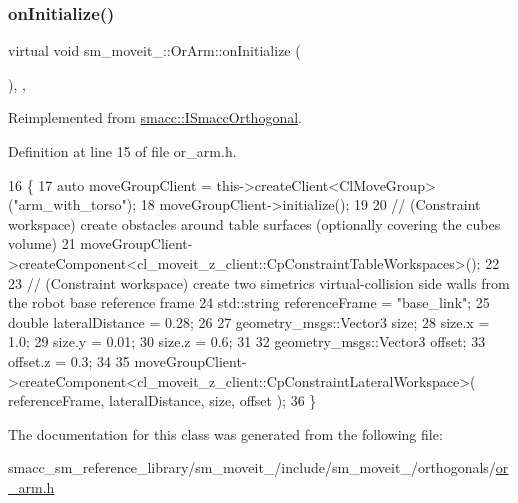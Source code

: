 \subsubsection{\texorpdfstring{on\+Initialize()}{onInitialize()}}
{\footnotesize\ttfamily virtual void sm\+\_\+moveit\+\_\+::\+Or\+Arm\+::on\+Initialize (\begin{DoxyParamCaption}{ }\end{DoxyParamCaption})\hspace{0.3cm}{\ttfamily [inline]}, {\ttfamily [override]}, {\ttfamily [virtual]}}



Reimplemented from \hyperlink{classsmacc_1_1ISmaccOrthogonal_a6bb31c620cb64dd7b8417f8705c79c7a}{smacc\+::\+I\+Smacc\+Orthogonal}.



Definition at line 15 of file or\+\_\+arm.\+h.


\begin{DoxyCode}
16         \{
17             \textcolor{keyword}{auto} moveGroupClient = this->createClient<ClMoveGroup>(\textcolor{stringliteral}{"arm\_with\_torso"});
18             moveGroupClient->initialize();
19 
20             \textcolor{comment}{// (Constraint workspace) create obstacles around table surfaces (optionally covering the cubes
       volume)}
21             moveGroupClient->createComponent<cl\_moveit\_z\_client::CpConstraintTableWorkspaces>();
22 
23             \textcolor{comment}{// (Constraint workspace) create two simetrics virtual-collision side walls from the robot base
       reference frame}
24             std::string referenceFrame = \textcolor{stringliteral}{"base\_link"};
25             \textcolor{keywordtype}{double} lateralDistance = 0.28;
26 
27             geometry\_msgs::Vector3 size;
28             size.x = 1.0;
29             size.y = 0.01;
30             size.z = 0.6;
31 
32             geometry\_msgs::Vector3 offset;
33             offset.z = 0.3;
34                         
35             moveGroupClient->createComponent<cl\_moveit\_z\_client::CpConstraintLateralWorkspace>(
      referenceFrame, lateralDistance, size, offset );
36         \}
\end{DoxyCode}


The documentation for this class was generated from the following file\+:\begin{DoxyCompactItemize}
\item 
smacc\+\_\+sm\+\_\+reference\+\_\+library/sm\+\_\+moveit\+\_/include/sm\+\_\+moveit\+\_/orthogonals/\hyperlink{4_2include_2sm__moveit__4_2orthogonals_2or__arm_8h}{or\+\_\+arm.\+h}\end{DoxyCompactItemize}
